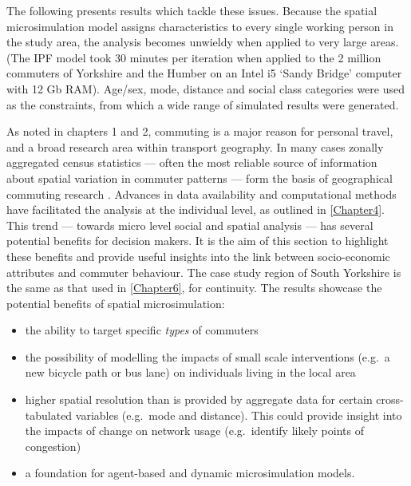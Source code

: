 The following presents results which tackle these issues.
Because the spatial microsimulation model assigns characteristics to every single
working person in the study area, the analysis becomes unwieldy when applied to
very large areas. (The IPF model took 30 minutes per iteration when applied
to the 2 million commuters of Yorkshire and the Humber on an Intel i5 `Sandy
Bridge' computer with 12 Gb RAM). Age/sex, mode,
distance and social class categories were used as the constraints, from which
a wide range of simulated results were generated.

As noted in chapters 1 and 2, commuting is a major reason for personal travel,
and a broad research area within transport geography. In many cases zonally
aggregated census statistics --- often the most reliable source of
information about spatial variation in commuter patterns --- form the basis of
geographical commuting research
\citep{Horner2002,Titheridge2006}.
Advances in data availability
and computational methods  have facilitated
the analysis at the individual level, as outlined in \cref{Chapter4}.
This trend --- towards micro level social and spatial analysis
--- has several potential benefits
for decision makers. It is the aim of this section to highlight these benefits
and provide useful insights into the link between socio-economic attributes
and commuter behaviour. The case study region of South Yorkshire is the same
as that used in \cref{Chapter6}, for continuity. The results showcase the
potential benefits of spatial microsimulation:
\begin{itemize}
 \item the ability to target specific \emph{types} of commuters
\item the possibility of modelling the impacts of small scale interventions
(e.g.~a new bicycle path or bus lane) on individuals living in the local area
\item higher spatial resolution than is provided by aggregate data for certain
cross-tabulated variables (e.g.~mode and distance). This could provide insight
into the impacts of change on network usage (e.g.~identify likely points of
congestion)
\item a foundation for agent-based and dynamic microsimulation models.
\end{itemize}

